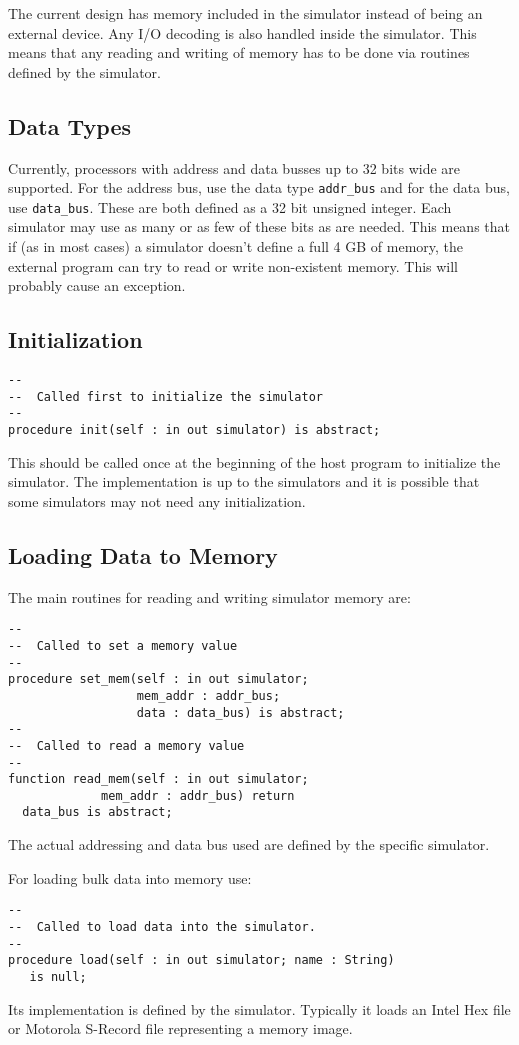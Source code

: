 \documentclass[10pt, openany]{book}
\begin{document}
The current design has memory included in the simulator instead of being an external device.  Any I/O decoding is also handled inside the simulator.  This means that any reading and writing of memory has to be done via routines defined by the simulator.

\subsection{Data Types}
Currently, processors with address and data busses up to 32 bits wide are supported.  For the address bus, use the data type \verb|addr_bus|  and for the data bus, use \verb|data_bus|.  These are both defined as a 32 bit unsigned integer.  Each simulator may use as many or as few of these bits as are needed.  This means that if (as in most cases) a simulator doesn't define a full 4 GB of memory, the external program can try to read or write non-existent memory.  This will probably cause an exception.

\subsection{Initialization}
\begin{lstlisting}
--
--  Called first to initialize the simulator
--
procedure init(self : in out simulator) is abstract;
\end{lstlisting}
This should be called once at the beginning of the host program to initialize the simulator.  The implementation is up to the simulators and it is possible that some simulators may not need any initialization.

\subsection{Loading Data to Memory}
The main routines for reading and writing simulator memory are:
\begin{lstlisting}
--
--  Called to set a memory value
--
procedure set_mem(self : in out simulator;
                  mem_addr : addr_bus;
                  data : data_bus) is abstract;
--
--  Called to read a memory value
--
function read_mem(self : in out simulator;
             mem_addr : addr_bus) return
  data_bus is abstract;
\end{lstlisting}
The actual addressing and data bus used are defined by the specific simulator.

For loading bulk data into memory use:
\begin{lstlisting}
--
--  Called to load data into the simulator.
--
procedure load(self : in out simulator; name : String)
   is null;
\end{lstlisting}
Its implementation is defined by the simulator.  Typically it loads an Intel Hex file or Motorola S-Record file representing a memory image.
\end{document}
